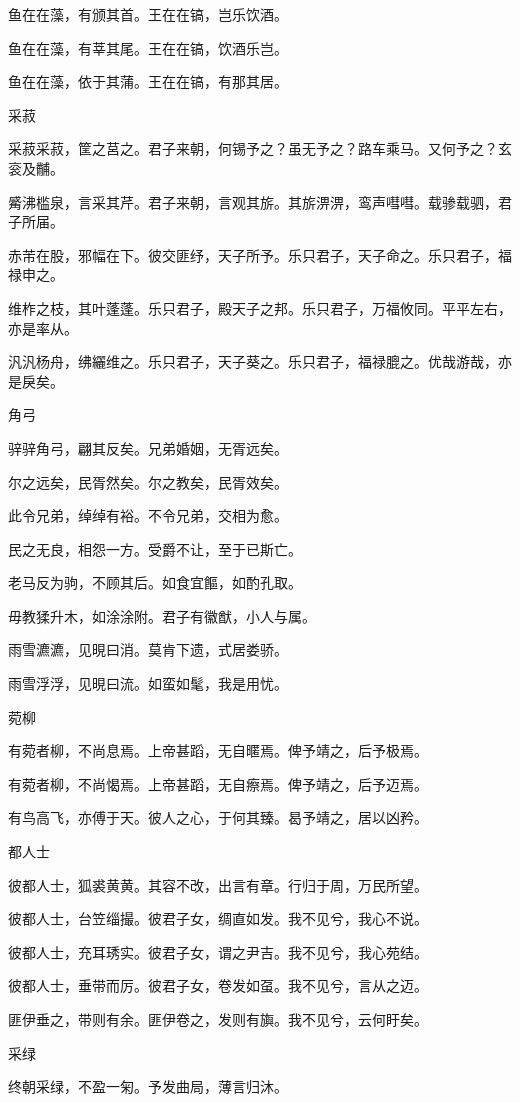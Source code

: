鱼在在藻，有颁其首。王在在镐，岂乐饮酒。

鱼在在藻，有莘其尾。王在在镐，饮酒乐岂。

鱼在在藻，依于其蒲。王在在镐，有那其居。

采菽

采菽采菽，筐之莒之。君子来朝，何锡予之？虽无予之？路车乘马。又何予之？玄衮及黼。

觱沸槛泉，言采其芹。君子来朝，言观其旂。其旂淠淠，鸾声嘒嘒。载骖载驷，君子所届。

赤芾在股，邪幅在下。彼交匪纾，天子所予。乐只君子，天子命之。乐只君子，福禄申之。

维柞之枝，其叶蓬蓬。乐只君子，殿天子之邦。乐只君子，万福攸同。平平左右，亦是率从。

汎汎杨舟，绋纚维之。乐只君子，天子葵之。乐只君子，福禄膍之。优哉游哉，亦是戾矣。

角弓

骍骍角弓，翩其反矣。兄弟婚姻，无胥远矣。

尔之远矣，民胥然矣。尔之教矣，民胥效矣。

此令兄弟，绰绰有裕。不令兄弟，交相为愈。

民之无良，相怨一方。受爵不让，至于已斯亡。

老马反为驹，不顾其后。如食宜饇，如酌孔取。

毋教猱升木，如涂涂附。君子有徽猷，小人与属。

雨雪瀌瀌，见晛曰消。莫肯下遗，式居娄骄。

雨雪浮浮，见晛曰流。如蛮如髦，我是用忧。

菀柳

有菀者柳，不尚息焉。上帝甚蹈，无自暱焉。俾予靖之，后予极焉。

有菀者柳，不尚愒焉。上帝甚蹈，无自瘵焉。俾予靖之，后予迈焉。

有鸟高飞，亦傅于天。彼人之心，于何其臻。曷予靖之，居以凶矜。

都人士

彼都人士，狐裘黄黄。其容不改，出言有章。行归于周，万民所望。

彼都人士，台笠缁撮。彼君子女，绸直如发。我不见兮，我心不说。

彼都人士，充耳琇实。彼君子女，谓之尹吉。我不见兮，我心苑结。

彼都人士，垂带而厉。彼君子女，卷发如虿。我不见兮，言从之迈。

匪伊垂之，带则有余。匪伊卷之，发则有旟。我不见兮，云何盱矣。

采绿

终朝采绿，不盈一匊。予发曲局，薄言归沐。


